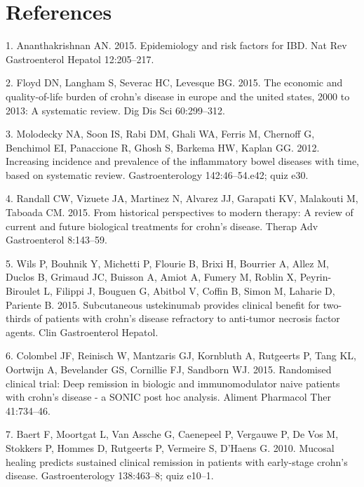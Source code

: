 \documentclass[11pt,]{article}
\begin{document}
\newpage

\section*{References}\label{references}

\hypertarget{refs}{}
\hypertarget{ref-ananthakrishnan_epidemiology_2015}{}
1. Ananthakrishnan AN. 2015. Epidemiology and risk factors for IBD. Nat
Rev Gastroenterol Hepatol 12:205--217.

\hypertarget{ref-floyd_economicburden_2015}{}
2. Floyd DN, Langham S, Severac HC, Levesque BG. 2015. The economic and
quality-of-life burden of crohn's disease in europe and the united
states, 2000 to 2013: A systematic review. Dig Dis Sci 60:299--312.

\hypertarget{ref-molodecky_increasingIBD_2012}{}
3. Molodecky NA, Soon IS, Rabi DM, Ghali WA, Ferris M, Chernoff G,
Benchimol EI, Panaccione R, Ghosh S, Barkema HW, Kaplan GG. 2012.
Increasing incidence and prevalence of the inflammatory bowel diseases
with time, based on systematic review. Gastroenterology 142:46--54.e42;
quiz e30.

\hypertarget{ref-randall_CDbiologics_2015}{}
4. Randall CW, Vizuete JA, Martinez N, Alvarez JJ, Garapati KV,
Malakouti M, Taboada CM. 2015. From historical perspectives to modern
therapy: A review of current and future biological treatments for
crohn's disease. Therap Adv Gastroenterol 8:143--59.

\hypertarget{ref-wils_ust_2015}{}
5. Wils P, Bouhnik Y, Michetti P, Flourie B, Brixi H, Bourrier A, Allez
M, Duclos B, Grimaud JC, Buisson A, Amiot A, Fumery M, Roblin X,
Peyrin-Biroulet L, Filippi J, Bouguen G, Abitbol V, Coffin B, Simon M,
Laharie D, Pariente B. 2015. Subcutaneous ustekinumab provides clinical
benefit for two-thirds of patients with crohn's disease refractory to
anti-tumor necrosis factor agents. Clin Gastroenterol Hepatol.

\hypertarget{ref-colombel_deepremission_2015}{}
6. Colombel JF, Reinisch W, Mantzaris GJ, Kornbluth A, Rutgeerts P, Tang
KL, Oortwijn A, Bevelander GS, Cornillie FJ, Sandborn WJ. 2015.
Randomised clinical trial: Deep remission in biologic and
immunomodulator naive patients with crohn's disease - a SONIC post hoc
analysis. Aliment Pharmacol Ther 41:734--46.

\hypertarget{ref-baert_mucosalhealing_2010}{}
7. Baert F, Moortgat L, Van Assche G, Caenepeel P, Vergauwe P, De Vos M,
Stokkers P, Hommes D, Rutgeerts P, Vermeire S, D'Haens G. 2010. Mucosal
healing predicts sustained clinical remission in patients with
early-stage crohn's disease. Gastroenterology 138:463--8; quiz e10--1.
\end{document}
